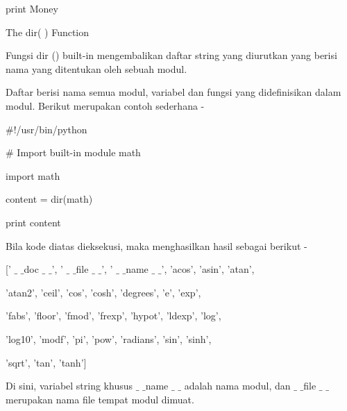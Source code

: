 \noindent 
 \hspace*{0.5in} print Money \par
\vspace{12pt}
\noindent 
The dir( ) Function \par
\noindent 
Fungsi dir () built-in mengembalikan daftar string yang diurutkan yang berisi nama yang ditentukan oleh sebuah modul. \par
\noindent 
Daftar berisi nama semua modul, variabel dan fungsi yang didefinisikan dalam modul. Berikut merupakan contoh sederhana - \par
\noindent 
 \hspace*{0.5in}  $  \#  $!/usr/bin/python \par
\vspace{12pt}
\noindent 
 \hspace*{0.5in}  $  \#  $ Import built-in module math \par
\noindent 
 \hspace*{0.5in} import math \par
\vspace{12pt}
\noindent 
 \hspace*{0.5in} content = dir(math) \par
\vspace{12pt}
\noindent 
 \hspace*{0.5in} print content \par
\noindent 
Bila kode diatas dieksekusi, maka menghasilkan hasil sebagai berikut - \par
\noindent 
 \hspace*{0.5in} [' $  \_  $ $  \_  $doc $  \_  $ $  \_  $', ' $  \_  $ $  \_  $file $  \_  $ $  \_  $', ' $  \_  $ $  \_  $name $  \_  $ $  \_  $', 'acos', 'asin', 'atan',  \par
\noindent 
 \hspace*{0.5in} 'atan2', 'ceil', 'cos', 'cosh', 'degrees', 'e', 'exp',  \par
\noindent 
 \hspace*{0.5in} 'fabs', 'floor', 'fmod', 'frexp', 'hypot', 'ldexp', 'log', \par
\noindent 
 \hspace*{0.5in} 'log10', 'modf', 'pi', 'pow', 'radians', 'sin', 'sinh',  \par
\noindent 
 \hspace*{0.5in} 'sqrt', 'tan', 'tanh'] \par
\noindent 
Di sini, variabel string khusus  $  \_  $ $  \_  $name $  \_  $ $  \_  $ adalah nama modul, dan  $  \_  $ $  \_  $file $  \_  $ $  \_  $ merupakan nama file tempat modul dimuat. \par
